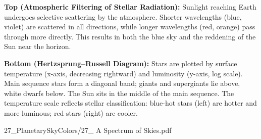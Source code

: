 \begin{SideNotePage}{
  
    \textbf{Top (Atmospheric Filtering of Stellar Radiation):}  
    Sunlight reaching Earth undergoes selective scattering by the atmosphere. Shorter wavelengths (blue, violet) are scattered in all directions, while longer wavelengths (red, orange) pass through more directly. This results in both the blue sky and the reddening of the Sun near the horizon. \par
  
    \textbf{Bottom (Hertzsprung–Russell Diagram):}  
    Stars are plotted by surface temperature (x-axis, decreasing rightward) and luminosity (y-axis, log scale). Main sequence stars form a diagonal band; giants and supergiants lie above, white dwarfs below. The Sun sits in the middle of the main sequence. The temperature scale reflects stellar classification: blue-hot stars (left) are hotter and more luminous; red stars (right) are cooler. \par
  
}{27_PlanetarySkyColors/27_ A Spectrum of Skies.pdf}
\end{SideNotePage}

